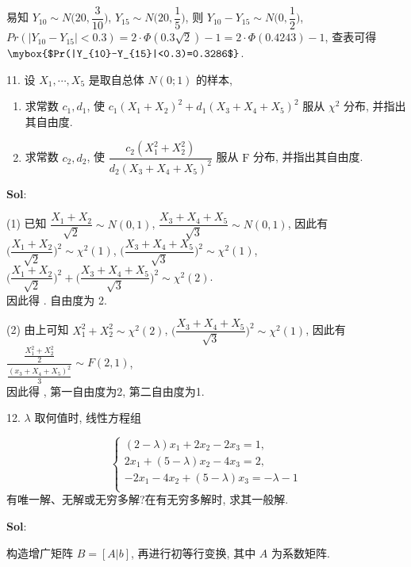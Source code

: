 易知 $Y_{10}\sim N\bigg(20,\dfrac{3}{10}\bigg)$, $Y_{15}\sim N\bigg(20,\dfrac{1}{5}\bigg)$, 则 $Y_{10}-Y_{15}\sim N\bigg(0,\dfrac{1}{2}\bigg)$, $Pr(|Y_{10}-Y_{15}|<0.3)=2\cdot \Phi(0.3\sqrt{2})-1=2\cdot\Phi(0.4243)-1$, 查表可得 $\mybox{$Pr(|Y_{10}-Y_{15}|<0.3)=0.3286$}$.

\vspace{12pt}

11. 设 $X_1,\cdots,X_5$ 是取自总体 $N(0;1)$ 的样本,
\begin{enumerate}[(1)]
    \item 求常数 $c_1,d_1$, 使 $c_1(X_1+X_2)^2+d_1(X_3+X_4+X_5)^2$ 服从 $\chi^2$ 分布, 并指出其自由度.
    \item 求常数 $c_2,d_2$, 使 $\dfrac{c_2(X_1^2+X_2^2)}{d_2(X_3+X_4+X_5)^2}$ 服从 $\text{F}$ 分布, 并指出其自由度.
\end{enumerate}

\textbf{Sol}:

(1) 已知 $\dfrac{X_1+X_2}{\sqrt{2}}\sim N(0,1)$, $\dfrac{X_3+X_4+X_5}{\sqrt{3}}\sim N(0,1)$, 因此有 $\Bigg(\dfrac{X_1+X_2}{\sqrt{2}}\Bigg)^2\sim \chi^2(1)$, $\Bigg(\dfrac{X_3+X_4+X_5}{\sqrt{3}}\Bigg)^2\sim\chi^2(1)$, $\Bigg(\dfrac{X_1+X_2}{\sqrt{2}}\Bigg)^2+\Bigg(\dfrac{X_3+X_4+X_5}{\sqrt{3}}\Bigg)^2\sim\chi^2(2)$. \\
因此得 . 自由度为 2.

(2) 由上可知 $X_1^2+X_2^2\sim \chi^2(2)$, $\Bigg(\dfrac{X_3+X_4+X_5}{\sqrt{3}}\Bigg)^2\sim \chi^2(1)$, 因此有 $\dfrac{\frac{X_1^2+X_2^2}{2}}{\frac{(x_3+X_4+X_5)^2}{3}}\sim F(2,1)$,\\
因此得 , 第一自由度为2, 第二自由度为1.

\vspace{12pt}

12. $\lambda$ 取何值时, 线性方程组

$$
\begin{cases}
(2-\lambda)x_1+2x_2-2x_3=1,\\
2x_1+(5-\lambda)x_2-4x_3=2,\\
-2x_1-4x_2+(5-\lambda)x_3=-\lambda-1\\
\end{cases}
$$
有唯一解、无解或无穷多解?在有无穷多解时, 求其一般解.

\textbf{Sol}:

构造增广矩阵 $B=[A|b]$, 再进行初等行变换, 其中 $A$ 为系数矩阵.

